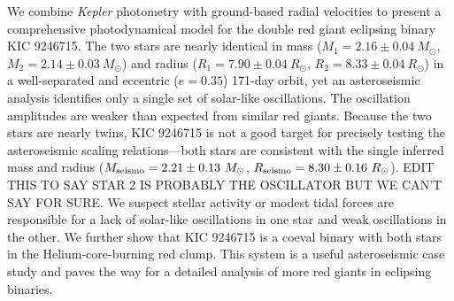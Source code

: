 We combine \emph{Kepler} photometry with ground-based radial velocities to present a comprehensive photodynamical model for the double red giant eclipsing binary KIC 9246715. The two stars are nearly identical in mass ($M_1 = 2.16 \pm 0.04\ M_{\odot}$, $M_2 = 2.14 \pm 0.03\ M_{\odot}$) and radius ($R_1 = 7.90 \pm 0.04 \ R_{\odot}$, $R_2 = 8.33 \pm 0.04 \ R_{\odot}$) in a well-separated and eccentric ($e = 0.35$) 171-day orbit, yet an asteroseismic analysis identifies only a single set of solar-like oscillations. The oscillation amplitudes are weaker than expected from similar red giants. Because the two stars are nearly twins, KIC 9246715 is not a good target for precisely testing the asteroseismic scaling relations---both stars are consistent with the single inferred mass and radius ($M_{\rm{seismo}} = 2.21 \pm 0.13 \ M_{\odot}$, $R_{\rm{seismo}} = 8.30 \pm 0.16 \ R_{\odot}$). EDIT THIS TO SAY STAR 2 IS PROBABLY THE OSCILLATOR BUT WE CAN'T SAY FOR SURE. We suspect stellar activity or modest tidal forces are responsible for a lack of solar-like oscillations in one star and weak oscillations in the other. We further show that KIC 9246715 is a coeval binary with both stars in the Helium-core-burning red clump. This system is a useful asteroseismic case study and paves the way for a detailed analysis of more red giants in eclipsing binaries.
    
    
  
  